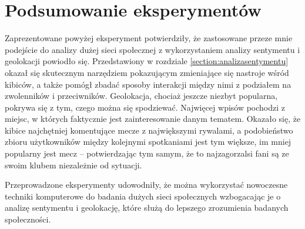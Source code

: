 \section{Podsumowanie eksperymentów}
Zaprezentowane powyżej eksperyment potwierdziły, że zastosowane przeze mnie
podejście do analizy dużej sieci społecznej z wykorzystaniem analizy sentymentu
i geolokacji powiodło się. Przedstawiony w rozdziale
\ref{section:analizasentymentu} okazał się skutecznym narzędziem pokazującym
zmieniające się nastroje wśród kibiców, a także pomógł zbadać sposoby interakcji
między nimi z podziałem na zwolenników i przeciwników. Geolokacja, chociaż
jeszcze niezbyt popularna, pokrywa się z tym, czego można się spodziewać. 
Najwięcej wpisów pochodzi z miejsc, w których faktycznie jest zainteresowanie
danym tematem. Okazało się, że kibice najchętniej komentujące mecze z
największymi rywalami, a podobieństwo zbioru użytkowników między kolejnymi
spotkaniami jest tym większe, im mniej popularny jest mecz -- potwierdzając tym
samym, że to najzagorzalsi fani są ze swoim klubem niezależnie od sytuacji.

Przeprowadzone eksperymenty udowodniły, że można wykorzystać nowoczesne techniki
komputerowe do badania dużych sieci społecznych wzbogacając je o analizę
sentymentu i geolokację, które służą do lepszego zrozumienia badanych
społeczności.


